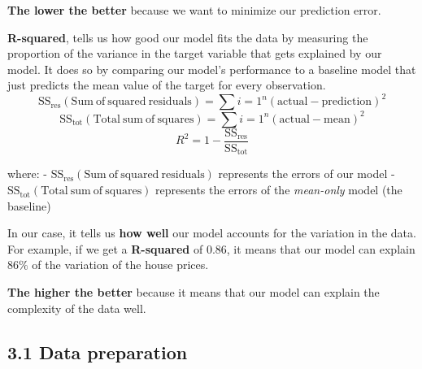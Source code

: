 \documentclass[11pt]{article}
\begin{document}
\textbf{The lower the better} because we want to minimize our prediction
error.

\textbf{R-squared}, tells us how good our model fits the data by
measuring the proportion of the variance in the target variable that
gets explained by our model. It does so by comparing our model's
performance to a baseline model that just predicts the mean value of the
target for every observation.
\[\mathrm{SS}_{\mathrm{res}}(\mathrm{Sum\ of\ squared\ residuals})=\sum{i=1}^{n}(\mathrm{actual}-\mathrm{prediction})^2\]
\[\mathrm{SS}_{\mathrm{tot}}(\mathrm{Total\ sum\ of\ squares})=\sum{i=1}^{n}(\mathrm{actual}-\mathrm{mean})^2\]
\[R^2=1-\frac{\mathrm{SS}_{\mathrm{res}}}{\mathrm{SS}_{\mathrm{tot}}}\]

where: -
\(\mathrm{SS}_{\mathrm{res}}(\mathrm{Sum\ of\ squared\ residuals})\)
represents the errors of our model -
\(\mathrm{SS}_{\mathrm{tot}}(\mathrm{Total\ sum\ of\ squares})\)
represents the errors of the \emph{mean-only} model (the baseline)

In our case, it tells us \textbf{how well} our model accounts for the
variation in the data. For example, if we get a \textbf{R-squared} of
\(0.86\), it means that our model can explain \(86\%\) of the variation
of the house prices.

\textbf{The higher the better} because it means that our model can
explain the complexity of the data well.

    \subsection{3.1 Data preparation}\label{data-preparation}
\end{document}
